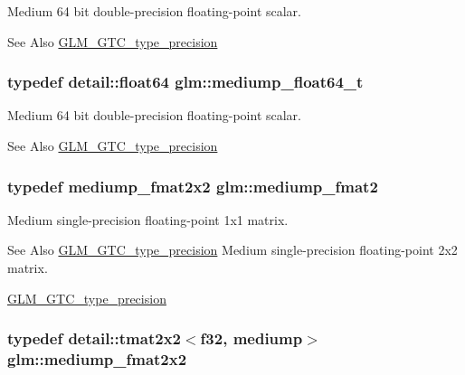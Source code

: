 Medium 64 bit double-\/precision floating-\/point scalar. \begin{DoxySeeAlso}{See Also}
\hyperlink{group__gtc__type__precision}{G\-L\-M\-\_\-\-G\-T\-C\-\_\-type\-\_\-precision} 
\end{DoxySeeAlso}
\hypertarget{group__gtc__type__precision_ga97a0747b103eb5ef320a91888de52f51}{
\subsubsection[{mediump\-\_\-float64\-\_\-t}]{\setlength{\rightskip}{0pt plus 5cm}typedef detail\-::float64 {\bf glm\-::mediump\-\_\-float64\-\_\-t}}}\label{group__gtc__type__precision_ga97a0747b103eb5ef320a91888de52f51}
Medium 64 bit double-\/precision floating-\/point scalar. \begin{DoxySeeAlso}{See Also}
\hyperlink{group__gtc__type__precision}{G\-L\-M\-\_\-\-G\-T\-C\-\_\-type\-\_\-precision} 
\end{DoxySeeAlso}
\hypertarget{group__gtc__type__precision_ga5b9de77ef7403ffc972700219eca5450}{
\subsubsection[{mediump\-\_\-fmat2}]{\setlength{\rightskip}{0pt plus 5cm}typedef mediump\-\_\-fmat2x2 {\bf glm\-::mediump\-\_\-fmat2}}}\label{group__gtc__type__precision_ga5b9de77ef7403ffc972700219eca5450}
Medium single-\/precision floating-\/point 1x1 matrix. \begin{DoxySeeAlso}{See Also}
\hyperlink{group__gtc__type__precision}{G\-L\-M\-\_\-\-G\-T\-C\-\_\-type\-\_\-precision} Medium single-\/precision floating-\/point 2x2 matrix. 

\hyperlink{group__gtc__type__precision}{G\-L\-M\-\_\-\-G\-T\-C\-\_\-type\-\_\-precision} 
\end{DoxySeeAlso}
\hypertarget{group__gtc__type__precision_gae9af1d96efbaeeb5c5edd9c7b0a24fa5}{
\subsubsection[{mediump\-\_\-fmat2x2}]{\setlength{\rightskip}{0pt plus 5cm}typedef detail\-::tmat2x2$<$f32, mediump$>$ {\bf glm\-::mediump\-\_\-fmat2x2}}}\label{group__gtc__type__precision_gae9af1d96efbaeeb5c5edd9c7b0a24fa5}
